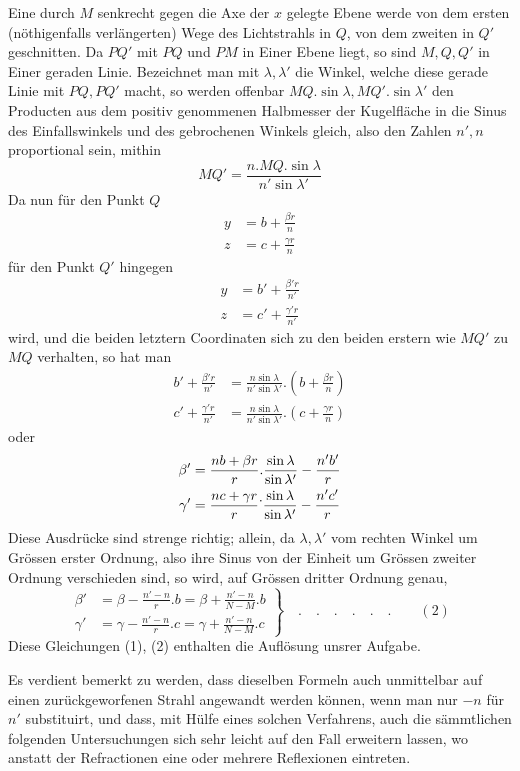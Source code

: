 Eine durch $M$ senkrecht gegen die Axe der $x$ gelegte Ebene werde von dem ersten (nöthigenfalls verlängerten) Wege des Lichtstrahls in $Q$, von dem zweiten in $Q'$ geschnitten. Da $PQ'$ mit $PQ$ und $PM$ in Einer Ebene liegt, so sind $M,Q,Q'$ in Einer geraden Linie. Bezeichnet man mit $\lambda,\lambda'$ die Winkel, welche diese gerade Linie mit $PQ,PQ'$ macht, so werden offenbar
$MQ.\sin\lambda,MQ'.\sin\lambda'$ den Producten aus dem positiv genommenen Halbmesser der Kugelfläche in die Sinus des Einfallswinkels und des gebrochenen Winkels gleich, also den Zahlen $n',n$ proportional sein, mithin
\[
MQ'=\frac{n.MQ.\sin\lambda}{n'\sin\lambda'}
\]
Da nun für den Punkt $Q$
\[
\begin{aligned}
y&=b+\frac{\beta r}n\\
z&=c+\frac{\gamma r}n
\end{aligned}
\]
für den Punkt $Q'$ hingegen
\[
\begin{aligned}
y&=b'+\frac{\beta'r}{n'}\\
z&=c'+\frac{\gamma'r}{n'}
\end{aligned}
\]
wird, und die beiden letztern Coordinaten sich zu den beiden erstern wie $MQ'$ zu $MQ$ verhalten, so hat man
\[
\begin{aligned}
b'+\frac{\beta'r}{n'}&=\frac{n\sin\lambda}{n'\sin\lambda'}.\left(b+\frac{\beta r}n\right)\\
c'+\frac{\gamma'r}{n'}&=\frac{n\sin\lambda}{n'\sin\lambda'}.\left(c+\frac{\gamma r}n\right)
\end{aligned}
\]
oder
\[
\begin{aligned}
\beta'&=\frac{nb+\beta r}{r}.\frac{\sin\lambda}{\sin\lambda'}-\frac{n'b'}r\\
\gamma'&=\frac{nc+\gamma r}{r}\raisebox{0.55em}{.}\frac{\sin\lambda}{\sin\lambda'}-\frac{n'c'}r
\end{aligned}
\]
Diese Ausdrücke sind strenge richtig; allein, da $\lambda,\lambda'$ vom rechten Winkel um Grössen erster Ordnung, also ihre Sinus von der Einheit um Grössen zweiter Ordnung verschieden sind, so wird, auf Grössen dritter Ordnung genau,
\[
\left.\begin{aligned}
\beta'&=\beta-\frac{n'-n}r.b=\beta+\frac{n'-n}{N-M}.b\\
\gamma'&=\gamma-\frac{n'-n}r.c=\gamma+\frac{n'-n}{N-M}.c
\end{aligned}\right\}\quad .\quad .\quad .\quad .\quad .\quad .\qquad(2)
\]
Diese Gleichungen (1), (2) enthalten die Auflösung unsrer Aufgabe.

Es verdient bemerkt zu werden, dass dieselben Formeln auch unmittelbar auf einen zurückgeworfenen Strahl angewandt werden können, wenn man nur $-n$ für $n'$ substituirt, und dass, mit Hülfe eines solchen Verfahrens, auch die sämmtlichen folgenden Untersuchungen sich sehr leicht auf den Fall erweitern lassen, wo anstatt der Refractionen eine oder mehrere Reflexionen eintreten.

